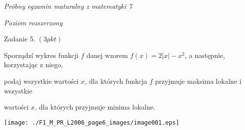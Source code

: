 \documentclass[a4paper,12pt]{article}
\begin{document}
{\it Próbny egzamin maturalny z matematyki 7}

{\it Poziom rozszerzony}

Zadanie 5. $(3pkt)$

Sporządzí wykres funkcji $f$ danej wzorem $f(x)=2|x|-x^{2}$, a następnie, korzystając z niego,

podaj wszystkie wartości $x$, dla których funkcja $f$ przyjmuje maksima lokalne i wszystkie

wartości $x$, dla których przyjmuje minima lokalne.
\begin{center}
\texttt{[image: ./F1\_M\_PR\_L2006\_page6\_images/image001.eps]}
\end{center}
\end{document}
